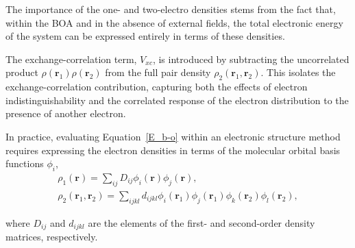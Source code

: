 The importance of the one- and two-electro densities stems from the fact that,
within the \gls{BOA} and in the absence of external fields, the total
electronic energy of the system can be expressed entirely in terms of these
densities.
%

The exchange-correlation term, $V_{xc}$, is introduced by subtracting the
uncorrelated product $\rho(\mathbf{r}_1)\rho(\mathbf{r}_2)$ from the full pair
density $\rho_2(\mathbf{r}_1, \mathbf{r}_2)$. This isolates the
exchange-correlation contribution, capturing both the effects of electron
indistinguishability and the correlated response of the electron distribution
to the presence of another electron.

In practice, evaluating Equation~\ref{E_b-o} within an electronic structure
method requires expressing the electron densities in terms of the molecular
orbital basis functions $\phi_i$,
%
\begin{gather}
  \rho_1 (\mathbf{r}) = \sum_{ij} D_{ij}\phi_{i}(\mathbf{r})\phi_{j}(\mathbf{r}), \\
  \rho_2 (\mathbf{r}_1, \mathbf{r}_2) = \sum_{ijkl}d_{ijkl}\phi_{i}(\mathbf{r}_1) \phi_{j}(\mathbf{r}_1)
    \phi_{k}(\mathbf{r}_2)\phi_{l}(\mathbf{r}_2),
\end{gather}

\noindent where $D_{ij}$ and $d_{ijkl}$ are the elements of the first-
and second-order density matrices, respectively.



